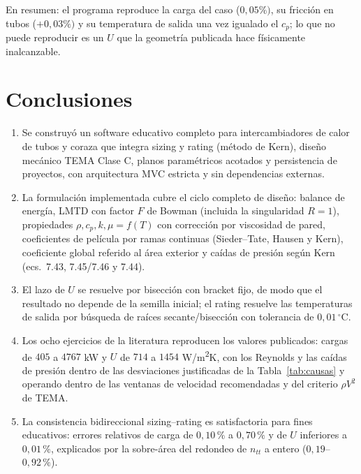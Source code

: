 \documentclass[11pt,a4paper]{article}
\begin{document}
En resumen: el programa reproduce la carga del caso ($0{,}05\%)$, su
fricci\'on en tubos ($+0{,}03\%)$ y su temperatura de salida una vez
igualado el $c_p$; lo que no puede reproducir es un $U$ que la
geometr\'ia publicada hace f\'isicamente inalcanzable.
\section{Conclusiones}
\label{sec:conclusiones}

\begin{enumerate}[leftmargin=1.6em]
\item Se construy\'o un software educativo completo para intercambiadores de
calor de tubos y coraza que integra sizing y rating (m\'etodo de Kern),
dise\~no mec\'anico TEMA Clase C, planos param\'etricos acotados y persistencia
de proyectos, con arquitectura MVC estricta y sin dependencias externas.

\item La formulaci\'on implementada cubre el ciclo completo de dise\~no:
balance de energ\'ia, LMTD con factor $F$ de Bowman (incluida la singularidad
$R = 1$), propiedades $\rho, c_p, k, \mu = f(T)$ con correcci\'on por viscosidad
de pared, coeficientes de pel\'icula por ramas continuas (Sieder--Tate, Hausen
y Kern), coeficiente global referido al \'area exterior y ca\'idas de presi\'on
seg\'un Kern (ecs.~7.43, 7.45/7.46 y 7.44).

\item El lazo de $U$ se resuelve por bisecci\'on con bracket fijo, de modo que
el resultado no depende de la semilla inicial; el rating resuelve las
temperaturas de salida por b\'usqueda de ra\'ices secante/bisecci\'on con
tolerancia de $0{,}01\,^\circ$C.

\item Los ocho ejercicios de la literatura reproducen los valores publicados:
cargas de $405$ a $4767$ kW y $U$ de $714$ a $1454$ W/m\textsuperscript{2}K, con
los Reynolds y las ca\'idas de presi\'on dentro de las desviaciones
justificadas de la Tabla~\ref{tab:causas} y operando dentro de las ventanas de
velocidad recomendadas y del criterio $\rho V^2$ de TEMA.

\item La consistencia bidireccional sizing--rating es satisfactoria para fines
educativos: errores relativos de carga de $0{,}10\,\%$ a $0{,}70\,\%$ y de $U$
inferiores a $0{,}01\,\%$, explicados por la sobre-\'area del redondeo de
$n_{tt}$ a entero ($0{,}19$--$0{,}92\,\%$).


\end{enumerate}
\end{document}
